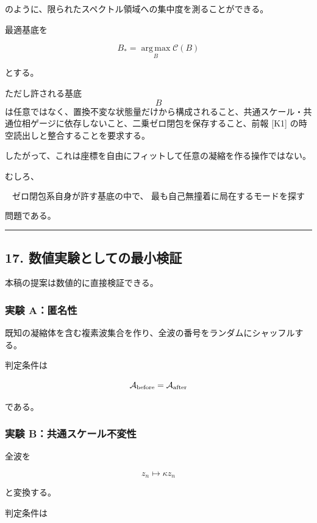 \documentclass[
  a4paper,
]{ltjsarticle}
\begin{document}
のように、限られたスペクトル領域への集中度を測ることができる。

最適基底を

\[
\boxed{
B_*
=
\operatorname*{arg\,max}_{B}
\mathcal C(B)
}
\tag{45}
\]

とする。

ただし許される基底 \[B\]
は任意ではなく、置換不変な状態量だけから構成されること、共通スケール・共通位相ゲージに依存しないこと、二乗ゼロ閉包を保存すること、前報
{[}K1{]} の時空読出しと整合することを要求する。

したがって、これは座標を自由にフィットして任意の凝縮を作る操作ではない。

むしろ、

\[
\boxed{
\text{ゼロ閉包系自身が許す基底の中で、
最も自己無撞着に局在するモードを探す}
}
\]

問題である。

\begin{center}\rule{0.5\linewidth}{0.5pt}\end{center}

\subsection{17.
数値実験としての最小検証}\label{ux6570ux5024ux5b9fux9a13ux3068ux3057ux3066ux306eux6700ux5c0fux691cux8a3c}

本稿の提案は数値的に直接検証できる。

\subsubsection{実験 A：匿名性}\label{ux5b9fux9a13-aux533fux540dux6027}

既知の凝縮体を含む複素波集合を作り、全波の番号をランダムにシャッフルする。

判定条件は

\[
\mathcal A_{\rm before}
=
\mathcal A_{\rm after}
\]

である。

\subsubsection{実験
B：共通スケール不変性}\label{ux5b9fux9a13-bux5171ux901aux30b9ux30b1ux30fcux30ebux4e0dux5909ux6027}

全波を

\[
z_n\mapsto\kappa z_n
\]

と変換する。

判定条件は
\end{document}
